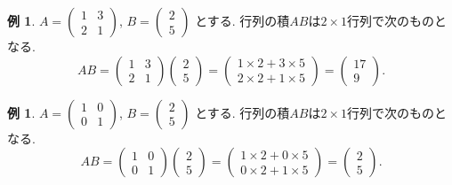 \documentclass[dvipdfmx,a4paper,11pt]{article}
\theoremstyle{definition}
\newtheorem{exa}[thm]{例}
\begin{document}
  \begin{exa}
 $ A= 
 \begin{pmatrix}
1 & 3\\
2 & 1
 \end{pmatrix}
 $, $
 B = 
 \begin{pmatrix}
2 \\5
 \end{pmatrix}
 $
 とする. 
 行列の積$AB$は$2 \times 1$行列で次のものとなる.  
 $$
 AB = 
 \begin{pmatrix}
1 & 3\\
2 & 1
 \end{pmatrix}
  \begin{pmatrix}
2 \\5
 \end{pmatrix}
 =  
 \begin{pmatrix}
1\times 2 + 3\times 5 \\
2\times 2 + 1 \times 5
 \end{pmatrix}
 = 
  \begin{pmatrix}
17 \\
9
 \end{pmatrix}.
 $$
 
  \end{exa}
   \begin{exa}
 $ A= 
 \begin{pmatrix}
1 & 0\\
0 & 1
 \end{pmatrix}
 $, $
 B = 
 \begin{pmatrix}
2 \\5
 \end{pmatrix}
 $
 とする. 
 行列の積$AB$は$2 \times 1$行列で次のものとなる.  
 $$
 AB = 
 \begin{pmatrix}
1 & 0\\
0 & 1
 \end{pmatrix}
  \begin{pmatrix}
2 \\5
 \end{pmatrix}
 =  
 \begin{pmatrix}
1\times 2 + 0\times 5 \\
0\times 2 + 1 \times 5
 \end{pmatrix}
 = 
  \begin{pmatrix}
2 \\5
 \end{pmatrix}.
 $$
 
 \end{exa}
 
\end{document}
